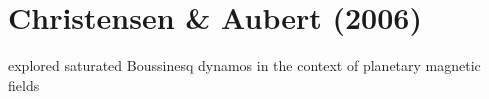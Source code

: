 \documentclass[12pt]{article} %
\begin{document}
		
\section{Christensen \& Aubert (2006)}
\citet{Christensen2006} explored saturated Boussinesq dynamos in the context of planetary magnetic fields 


\end{document}
